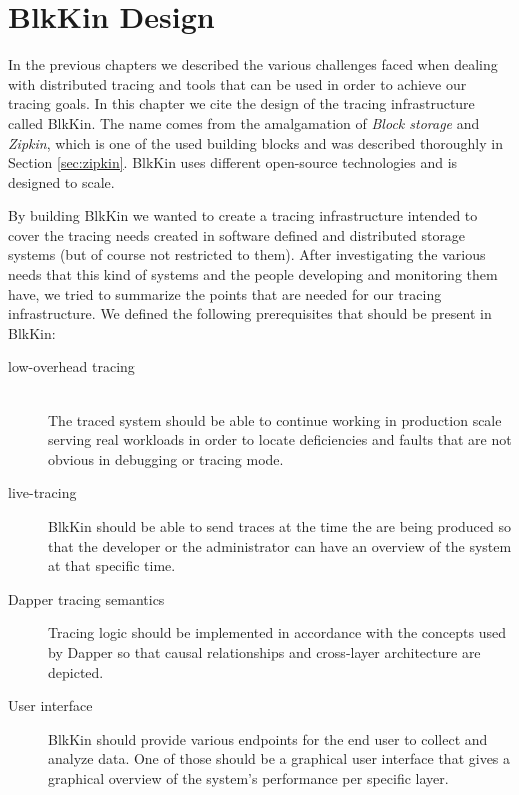 \chapter{BlkKin Design}\label{ch:design}

In the previous chapters we described the various challenges faced when dealing
with distributed tracing and tools that can be used in order to achieve our
tracing goals. In this chapter we cite the design of the tracing infrastructure
called BlkKin. The name comes from the amalgamation of \textit{Block storage}
and \textit{Zipkin}, which is one of the used building blocks and was described
thoroughly in Section \ref{sec:zipkin}. BlkKin uses different open-source
technologies and is designed to scale. 

By building BlkKin we wanted to create a tracing infrastructure intended to
cover the tracing needs created in software defined and distributed storage
systems (but of course not restricted to them). After investigating the various
needs that this kind of systems and the people developing and monitoring them
have, we tried to summarize the points that are needed for our tracing
infrastructure. We defined the following prerequisites that should be present in
BlkKin:

\begin{description}

\item[low-overhead tracing] \hfill \\
The traced system should be able to continue working in production scale serving
real workloads in order to locate deficiencies and faults that are not obvious
in debugging or tracing mode.

\item[live-tracing]
BlkKin should be able to send traces at the time the are being produced so that
the developer or the administrator can have an overview of the system at that
specific time.

\item[Dapper tracing semantics]
Tracing logic should be implemented in accordance with the concepts used by
Dapper so that causal relationships and cross-layer architecture are depicted.

\item[User interface]
BlkKin should provide various endpoints for the end user to collect and analyze
data. One of those should be a graphical user interface that gives a graphical
overview of the system's performance per specific layer.

\end{description}

